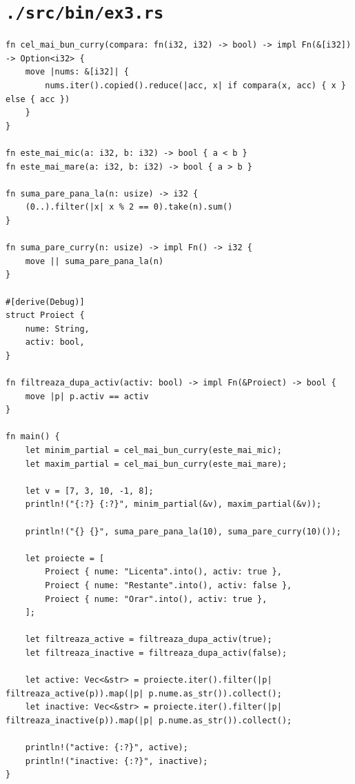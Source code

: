 \documentclass[11pt]{article}
\begin{document}
\section{\texttt{./src/bin/ex3.rs}}
\label{sec:org5d2e2a6}
\begin{verbatim}
fn cel_mai_bun_curry(compara: fn(i32, i32) -> bool) -> impl Fn(&[i32]) -> Option<i32> {
    move |nums: &[i32]| {
        nums.iter().copied().reduce(|acc, x| if compara(x, acc) { x } else { acc })
    }
}

fn este_mai_mic(a: i32, b: i32) -> bool { a < b }
fn este_mai_mare(a: i32, b: i32) -> bool { a > b }

fn suma_pare_pana_la(n: usize) -> i32 {
    (0..).filter(|x| x % 2 == 0).take(n).sum()
}

fn suma_pare_curry(n: usize) -> impl Fn() -> i32 {
    move || suma_pare_pana_la(n)
}

#[derive(Debug)]
struct Proiect {
    nume: String,
    activ: bool,
}

fn filtreaza_dupa_activ(activ: bool) -> impl Fn(&Proiect) -> bool {
    move |p| p.activ == activ
}

fn main() {
    let minim_partial = cel_mai_bun_curry(este_mai_mic);
    let maxim_partial = cel_mai_bun_curry(este_mai_mare);

    let v = [7, 3, 10, -1, 8];
    println!("{:?} {:?}", minim_partial(&v), maxim_partial(&v));

    println!("{} {}", suma_pare_pana_la(10), suma_pare_curry(10)());

    let proiecte = [
        Proiect { nume: "Licenta".into(), activ: true },
        Proiect { nume: "Restante".into(), activ: false },
        Proiect { nume: "Orar".into(), activ: true },
    ];

    let filtreaza_active = filtreaza_dupa_activ(true);
    let filtreaza_inactive = filtreaza_dupa_activ(false);

    let active: Vec<&str> = proiecte.iter().filter(|p| filtreaza_active(p)).map(|p| p.nume.as_str()).collect();
    let inactive: Vec<&str> = proiecte.iter().filter(|p| filtreaza_inactive(p)).map(|p| p.nume.as_str()).collect();

    println!("active: {:?}", active);
    println!("inactive: {:?}", inactive);
}
\end{verbatim}
\end{document}
